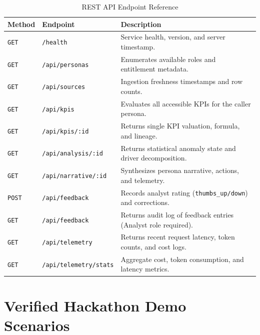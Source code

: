 \documentclass[11pt,a4paper]{article}
\begin{document}
\begin{table}[h!]
\centering
\small
\begin{tabularx}{\textwidth}{llX}
\toprule
\textbf{Method} & \textbf{Endpoint} & \textbf{Description} \\
\midrule
\texttt{GET} & \texttt{/health} & Service health, version, and server timestamp. \\
\texttt{GET} & \texttt{/api/personas} & Enumerates available roles and entitlement metadata. \\
\texttt{GET} & \texttt{/api/sources} & Ingestion freshness timestamps and row counts. \\
\texttt{GET} & \texttt{/api/kpis} & Evaluates all accessible KPIs for the caller persona. \\
\texttt{GET} & \texttt{/api/kpis/:id} & Returns single KPI valuation, formula, and lineage. \\
\texttt{GET} & \texttt{/api/analysis/:id} & Returns statistical anomaly state and driver decomposition. \\
\texttt{GET} & \texttt{/api/narrative/:id} & Synthesizes persona narrative, actions, and telemetry. \\
\texttt{POST} & \texttt{/api/feedback} & Records analyst rating (\texttt{thumbs\_up/down}) and corrections. \\
\texttt{GET} & \texttt{/api/feedback} & Returns audit log of feedback entries (Analyst role required). \\
\texttt{GET} & \texttt{/api/telemetry} & Returns recent request latency, token counts, and cost logs. \\
\texttt{GET} & \texttt{/api/telemetry/stats} & Aggregate cost, token consumption, and latency metrics. \\
\bottomrule
\end{tabularx}
\caption{REST API Endpoint Reference}
\end{table}

\section{Verified Hackathon Demo Scenarios}
\end{document}
